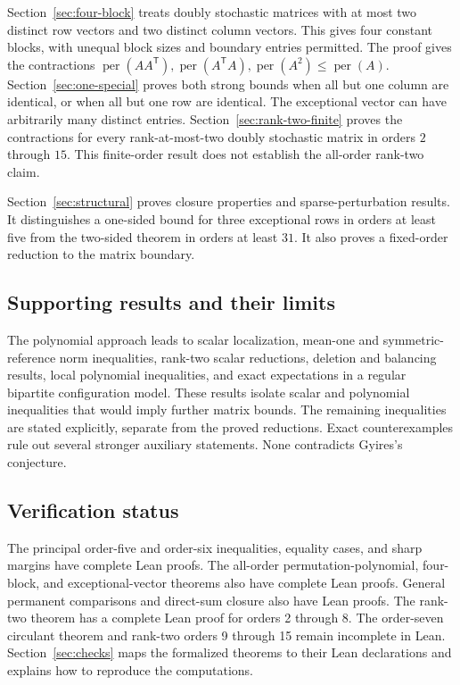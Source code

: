 \documentclass[11pt,a4paper]{article}
\theoremstyle{definition}
\theoremstyle{remark}
\newcommand{\per}{\operatorname{per}}
\newcommand{\T}{\mathsf{T}}
\begin{document}
Section~\ref{sec:four-block} treats doubly stochastic matrices with at most two distinct row vectors and two distinct column vectors.
This gives four constant blocks, with unequal block sizes and boundary entries permitted.
The proof gives the contractions $\per(AA^\T),\per(A^\T A),\per(A^2)\le\per(A)$.
Section~\ref{sec:one-special} proves both strong bounds when all but one column are identical, or when all but one row are identical.
The exceptional vector can have arbitrarily many distinct entries.
Section~\ref{sec:rank-two-finite} proves the contractions for every rank-at-most-two doubly stochastic matrix in orders $2$ through $15$.
This finite-order result does not establish the all-order rank-two claim.

Section~\ref{sec:structural} proves closure properties and sparse-perturbation results.
It distinguishes a one-sided bound for three exceptional rows in orders at least five from the two-sided theorem in orders at least $31$.
It also proves a fixed-order reduction to the matrix boundary.

\subsection{Supporting results and their limits}

The polynomial approach leads to scalar localization, mean-one and symmetric-reference norm inequalities,
rank-two scalar reductions, deletion and balancing results, local polynomial inequalities,
and exact expectations in a regular bipartite configuration model.
These results isolate scalar and polynomial inequalities that would imply further matrix bounds.
The remaining inequalities are stated explicitly, separate from the proved reductions.
Exact counterexamples rule out several stronger auxiliary statements. None contradicts Gyires's conjecture.

\subsection{Verification status}

The principal order-five and order-six inequalities, equality cases, and sharp margins have complete Lean proofs.
The all-order permutation-polynomial, four-block, and exceptional-vector theorems also have complete Lean proofs.
General permanent comparisons and direct-sum closure also have Lean proofs.
The rank-two theorem has a complete Lean proof for orders 2 through 8. The order-seven circulant theorem and rank-two orders 9 through 15 remain incomplete in Lean.
Section~\ref{sec:checks} maps the formalized theorems to their Lean declarations and explains how to reproduce the computations.
\end{document}
